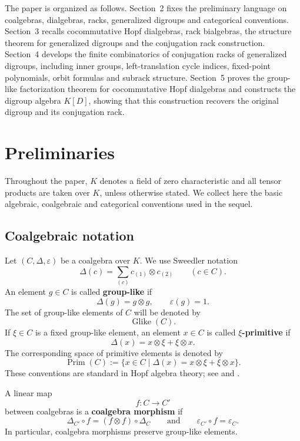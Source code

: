 \documentclass[11pt]{article}
\theoremstyle{plain}
\theoremstyle{definition}
\theoremstyle{remark}
\DeclareMathOperator{\Glike}{Glike}
\DeclareMathOperator{\Prim}{Prim}
\begin{document}
	The paper is organized as follows. Section~2 fixes the preliminary language on
	coalgebras, dialgebras, racks, generalized digroups and categorical
	conventions. Section~3 recalls cocommutative Hopf dialgebras, rack bialgebras,
	the structure theorem for generalized digroups and the conjugation rack
	construction. Section~4 develops the finite combinatorics of conjugation racks
	of generalized digroups, including inner groups, left-translation cycle
	indices, fixed-point polynomials, orbit formulas and subrack structure.
	Section~5 proves the group-like factorization theorem for cocommutative Hopf
	dialgebras and constructs the digroup algebra \(K[D]\), showing that this
	construction recovers the original digroup and its conjugation rack.
	
	\section{Preliminaries}\label{sec:preliminaries}
	
	Throughout the paper, \(K\) denotes a field of zero characteristic and all tensor products are taken
	over \(K\), unless otherwise stated. We collect here the basic algebraic,
	coalgebraic and categorical conventions used in the sequel.
	
	\subsection{Coalgebraic notation}
	
	Let \((C,\Delta,\varepsilon)\) be a coalgebra over \(K\). We use Sweedler
	notation
	\[
	\Delta(c)=\sum_{(c)}c_{(1)}\otimes c_{(2)}
	\qquad
	(c\in C).
	\]
	An element \(g\in C\) is called \textbf{group-like} if
	\[
	\Delta(g)=g\otimes g,
	\qquad
	\varepsilon(g)=1.
	\]
	The set of group-like elements of \(C\) will be denoted by
	\[
	\Glike(C).
	\]
	If \(\xi\in C\) is a fixed group-like element, an element \(x\in C\) is called
	\textbf{\(\xi\)-primitive} if
	\[
	\Delta(x)=x\otimes \xi+\xi\otimes x.
	\]
	The corresponding space of primitive elements is denoted by
	\[
	\Prim(C)
	:=
	\{x\in C\mid \Delta(x)=x\otimes \xi+\xi\otimes x\}.
	\]
	These conventions are standard in Hopf algebra theory; see
	\cite[Chapter~III]{Kassel1995} and \cite[Chapter~1]{Majid1995}.
	
	A linear map
	\[
	f:C\longrightarrow C'
	\]
	between coalgebras is a \textbf{coalgebra morphism} if
	\[
	\Delta_{C'}\circ f=(f\otimes f)\circ\Delta_C
	\qquad
	\text{and}
	\qquad
	\varepsilon_{C'}\circ f=\varepsilon_C.
	\]
	In particular, coalgebra morphisms preserve group-like elements.
	
\end{document}
